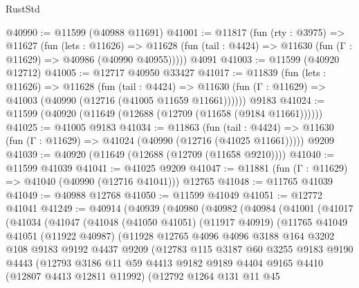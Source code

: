 \begin{lexlean}{RustStd}
\begin{coremodule}
@40990 := @11599 (@40988 @11691)
@41001 := @11817
    (fun (rty : @3975) =>
    @11627
      (fun (lets : @11626) =>
      @11628 (fun (tail : @4424) => @11630 (fun (Γ : @11629) => @40986 (@40990 @40955)))))
    @4091
@41003 := @11599 (@40920 @12712)
@41005 := @12717 @40950 @33427
@41017 := @11839
    (fun (lets : @11626) =>
    @11628
      (fun (tail : @4424) =>
      @11630 (fun (Γ : @11629) => @41003 (@40990 (@12716 (@41005 @11659 @11661))))))
    @9183
@41024 := @11599 (@40920 (@11649 (@12688 (@12709 (@11658 (@9184 @11661))))))
@41025 := @41005 @9183
@41034 := @11863
    (fun (tail : @4424) => @11630 (fun (Γ : @11629) => @41024 (@40990 (@12716 (@41025 @11661)))))
    @9209
@41039 := @40920 (@11649 (@12688 (@12709 (@11658 @9210))))
@41040 := @11599 @41039
@41041 := @41025 @9209
@41047 := @11881 (fun (Γ : @11629) => @41040 (@40990 (@12716 @41041))) @12765
@41048 := @11765 @41039
@41049 := @40988 @12768
@41050 := @11599 @41049
@41051 := @12772 @41041
@41249 := @40914
    (@40939
      (@40980
        (@40982
          (@40984
            (@41001
              (@41017
                (@41034
                  (@41047
                    (@41048
                      (@41050 @41051)
                      (@11917 @40919)
                      (@11765
                        @41049
                        @41051
                        (@11922 @40987)
                        (@11928
                          @12765
                          @4096
                          @4096
                          @3188
                          @164
                          @3202
                          @108
                          @9183
                          @9192
                          @4437
                          @9209
                          (@12783
                            @115
                            @3187
                            @60
                            @3255
                            @9183
                            @9190
                            @4443
                            (@12793
                              @3186
                              @11
                              @59
                              @4413
                              @9182
                              @9189
                              @4404
                              @9165
                              @4410
                              (@12807 @4413 @12811 @11992)
                              (@12792
                                @1264
                                @131
                                @11
                                @45

\end{coremodule}
\end{lexlean}
